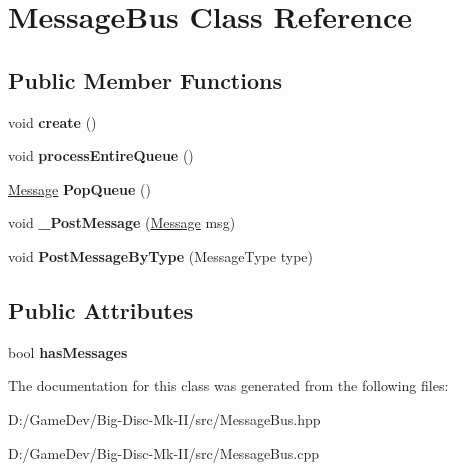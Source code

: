 \hypertarget{class_message_bus}{}\section{Message\+Bus Class Reference}
\label{class_message_bus}
\subsection*{Public Member Functions}
\begin{DoxyCompactItemize}
\item 
\mbox{\label{class_message_bus_a8a1d58300a85979149fabb0ac720b42f}} 
void {\bfseries create} ()
\item 
\mbox{\label{class_message_bus_a9ed188fad2bd6b80c5d179f709228f5e}} 
void {\bfseries process\+Entire\+Queue} ()
\item 
\mbox{\label{class_message_bus_a3088822b4c96563d96721c4fbaa3d163}} 
\mbox{\hyperlink{class_message}{Message}} {\bfseries Pop\+Queue} ()
\item 
\mbox{\label{class_message_bus_ac76a28e987bd78c97149379107f11cc7}} 
void {\bfseries \+\_\+\+Post\+Message} (\mbox{\hyperlink{class_message}{Message}} msg)
\item 
\mbox{\label{class_message_bus_a690ff640dfee13efc912f0b753fce218}} 
void {\bfseries Post\+Message\+By\+Type} (Message\+Type type)
\end{DoxyCompactItemize}
\subsection*{Public Attributes}
\begin{DoxyCompactItemize}
\item 
\mbox{\label{class_message_bus_a31e305f1b491548de0263727f0ec0605}} 
bool {\bfseries has\+Messages}
\end{DoxyCompactItemize}


The documentation for this class was generated from the following files\+:\begin{DoxyCompactItemize}
\item 
D\+:/\+Game\+Dev/\+Big-\/\+Disc-\/\+Mk-\/\+I\+I/src/Message\+Bus.\+hpp\item 
D\+:/\+Game\+Dev/\+Big-\/\+Disc-\/\+Mk-\/\+I\+I/src/Message\+Bus.\+cpp\end{DoxyCompactItemize}
